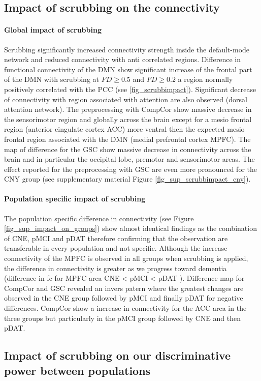 \documentclass[authoryear]{elsarticle}
\begin{document}
\subsection{Impact of scrubbing on the connectivity}
\paragraph{Global impact of scrubbing}
Scrubbing significantly increased connectivity strength inside the default-mode network and reduced connectivity with anti correlated regions. Difference in functional connectivity of the DMN show significant increase of the frontal part of the DMN with scrubbing at $FD\geq0.5$ and $FD\geq0.2$ a region normally positively correlated with the PCC (see \ref{fig_scrubbimpact}). Significant decrease of connectivity with region associated with attention are also observed (dorsal attention network). The preprocessing with CompCor show massive decrease in the sensorimotor region and globally across the brain except for a mesio frontal region (anterior cingulate cortex ACC) more ventral then the expected mesio frontal region associated with the DMN (medial prefrontal cortex MPFC). The map of difference for the GSC show massive decrease in connectivity across the brain and in particular the occipital lobe, premotor and sensorimotor areas. The effect reported for the preprocessing with GSC are even more pronounced for 
the CNY group (see supplementary material Figure \ref{fig_sup_scrubbimpact_cny}).
\paragraph{Population specific impact of scrubbing}
The population specific difference in connectivity (see Figure \ref{fig_sup_impact_on_groups}) show almost identical findings as the combination of CNE, pMCI and pDAT therefore confirming that the observation are transferable in every population and not specific. Although the increase connectivity of the MPFC is observed in all groups when scrubbing is applied, the difference in connectivity is greater as we progress toward dementia (difference in fc for MPFC area CNE < pMCI < pDAT ). Difference map for CompCor and GSC revealed an invers patern where the greatest changes are observed in the CNE group followed by pMCI and finally pDAT for negative differences. CompCor show a increase in connectivity for the ACC area in the three groups but particularly in the pMCI group followed by CNE and then pDAT.

\subsection{Impact of scrubbing on our discriminative power between populations}
\end{document}
